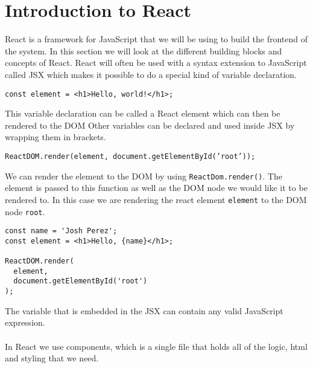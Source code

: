 \section{Introduction to React}
React is a framework for JavaScript that we will be using to build the frontend of the system. 
In this section we will look at the different building blocks and concepts of React.
React will often be used with a syntax extension to JavaScript called JSX which makes it possible to do a special kind of variable declaration.

\begin{center}
    \texttt{const element = <h1>Hello, world!</h1>;}
\end{center}
This variable declaration can be called a React element which can then be rendered to the DOM
Other variables can be declared and used inside JSX by wrapping them in brackets.
\begin{center}
    \texttt{ReactDOM.render(element, document.getElementById('root'));}
\end{center}
We can render the element to the DOM by using \texttt{ReactDom.render()}. The element is passed to this function as well as the DOM node we would like it to be rendered to. In this case we are rendering the react element \texttt{element} to the DOM node \texttt{root}.
\begin{lstlisting}
const name = 'Josh Perez';
const element = <h1>Hello, {name}</h1>;

ReactDOM.render(
  element,
  document.getElementById('root')
);
\end{lstlisting}
The variable that is embedded in the JSX can contain any valid JavaScript expression.
\\\\
In React we use components, which is a single file that holds all of the logic, html and styling that we need.

